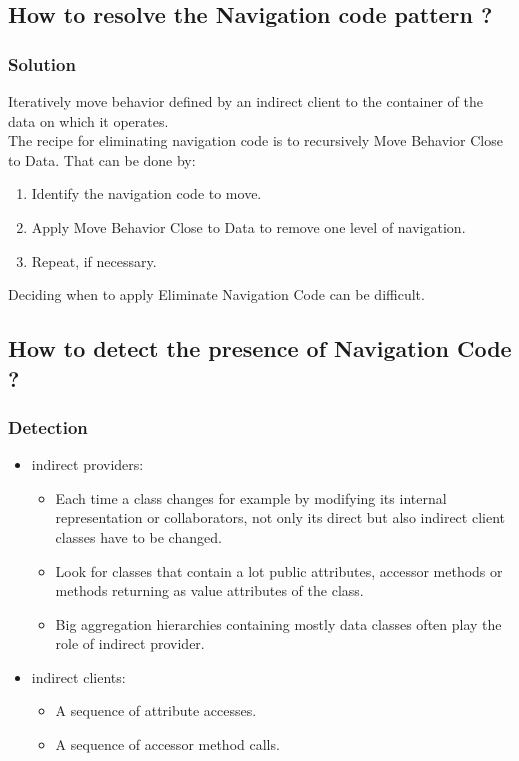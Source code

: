 \documentclass{beamer}
\begin{document}
\subsection{How to resolve the Navigation code pattern ?}
\begin{frame}
\frametitle{Solution}
Iteratively move behavior defined by an indirect client to the container of the data on which it operates.\\
The recipe for eliminating navigation code is to recursively Move Behavior Close to Data. That can be done by:
\begin{enumerate}
\item Identify the navigation code to move.
\item Apply Move Behavior Close to Data to remove one level of navigation. 
\item Repeat, if necessary.
\end{enumerate}
Deciding when to apply Eliminate Navigation Code can be difficult.
\end{frame}

\subsection{How to detect the presence of Navigation Code ?}
\begin{frame}
\frametitle{Detection}
\begin{itemize}
\item indirect providers:
\begin{itemize}
\item Each time a class changes for example by modifying its internal representation or collaborators, not only its direct but also indirect client classes have to be changed.
\item Look for classes that contain a lot public attributes, accessor methods or methods returning as value attributes of the class.
\item Big aggregation hierarchies containing mostly data classes often play the role of indirect provider.
\end{itemize}
\item indirect clients:
\begin{itemize}
\item A sequence of attribute accesses.
\item A sequence of accessor method calls.
\end{itemize}
\end{itemize}
\end{frame}
\end{document}
